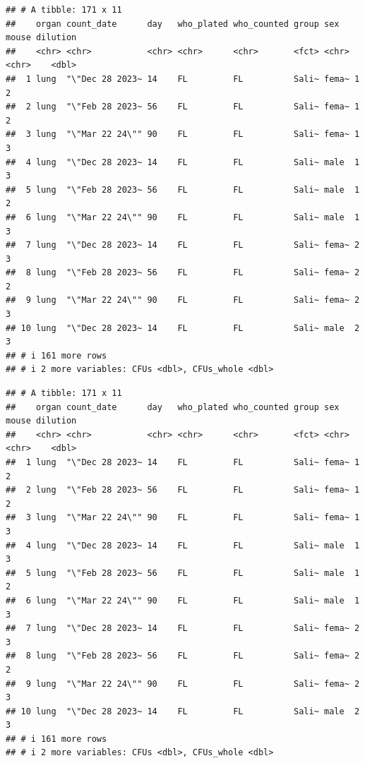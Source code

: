 \documentclass[
]{book}
\begin{document}
\begin{verbatim}
## # A tibble: 171 x 11
##    organ count_date      day   who_plated who_counted group sex   mouse dilution
##    <chr> <chr>           <chr> <chr>      <chr>       <fct> <chr> <chr>    <dbl>
##  1 lung  "\"Dec 28 2023~ 14    FL         FL          Sali~ fema~ 1            2
##  2 lung  "\"Feb 28 2023~ 56    FL         FL          Sali~ fema~ 1            2
##  3 lung  "\"Mar 22 24\"" 90    FL         FL          Sali~ fema~ 1            3
##  4 lung  "\"Dec 28 2023~ 14    FL         FL          Sali~ male  1            3
##  5 lung  "\"Feb 28 2023~ 56    FL         FL          Sali~ male  1            2
##  6 lung  "\"Mar 22 24\"" 90    FL         FL          Sali~ male  1            3
##  7 lung  "\"Dec 28 2023~ 14    FL         FL          Sali~ fema~ 2            3
##  8 lung  "\"Feb 28 2023~ 56    FL         FL          Sali~ fema~ 2            2
##  9 lung  "\"Mar 22 24\"" 90    FL         FL          Sali~ fema~ 2            3
## 10 lung  "\"Dec 28 2023~ 14    FL         FL          Sali~ male  2            3
## # i 161 more rows
## # i 2 more variables: CFUs <dbl>, CFUs_whole <dbl>
\end{verbatim}

\begin{verbatim}
## # A tibble: 171 x 11
##    organ count_date      day   who_plated who_counted group sex   mouse dilution
##    <chr> <chr>           <chr> <chr>      <chr>       <fct> <chr> <chr>    <dbl>
##  1 lung  "\"Dec 28 2023~ 14    FL         FL          Sali~ fema~ 1            2
##  2 lung  "\"Feb 28 2023~ 56    FL         FL          Sali~ fema~ 1            2
##  3 lung  "\"Mar 22 24\"" 90    FL         FL          Sali~ fema~ 1            3
##  4 lung  "\"Dec 28 2023~ 14    FL         FL          Sali~ male  1            3
##  5 lung  "\"Feb 28 2023~ 56    FL         FL          Sali~ male  1            2
##  6 lung  "\"Mar 22 24\"" 90    FL         FL          Sali~ male  1            3
##  7 lung  "\"Dec 28 2023~ 14    FL         FL          Sali~ fema~ 2            3
##  8 lung  "\"Feb 28 2023~ 56    FL         FL          Sali~ fema~ 2            2
##  9 lung  "\"Mar 22 24\"" 90    FL         FL          Sali~ fema~ 2            3
## 10 lung  "\"Dec 28 2023~ 14    FL         FL          Sali~ male  2            3
## # i 161 more rows
## # i 2 more variables: CFUs <dbl>, CFUs_whole <dbl>
\end{verbatim}
\end{document}
